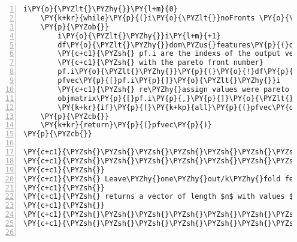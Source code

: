 \begin{Verbatim}[commandchars=\\\{\},codes={\catcode`\$=3\catcode`\^=7\catcode`\_=8},gobble=0,numbers=left,fontfamily=fvm,fontshape=n,fontsize=\footnotesize,tabsize=2]
	i\PY{o}{\PYZlt{}\PYZhy{}}\PY{l+m}{0}
	\PY{k+kr}{while}\PY{p}{(}i\PY{o}{\PYZlt{}}noFronts \PY{o}{\PYZam{}\PYZam{}} \PY{o}{!}allFrontsFound\PY{p}{)} \PY{c+c1}{\PYZsh{}go thru all fronts required}
	\PY{p}{\PYZob{}}
		i\PY{o}{\PYZlt{}\PYZhy{}}i\PY{l+m}{+1}
		df\PY{o}{\PYZlt{}\PYZhy{}}dom\PYZus{}features\PY{p}{(}objmatrix\PY{p}{,}\PY{k+kp}{rep}\PY{p}{(}\PY{k+kc}{FALSE}\PY{p}{,}m\PY{p}{)}\PY{p}{)} \PY{c+c1}{\PYZsh{}general m obj vectors function}
		\PY{c+c1}{\PYZsh{} pf.i are the indexs of the output vector that need to be updated }
		\PY{c+c1}{\PYZsh{} with the pareto front number}
		pf.i\PY{o}{\PYZlt{}\PYZhy{}}\PY{p}{(}\PY{o}{!}df\PY{p}{)} \PY{o}{\PYZam{}} \PY{p}{(}pfvec\PY{o}{\PYZlt{}}\PY{l+m}{1}\PY{p}{)} 
		pfvec\PY{p}{[}pf.i\PY{p}{]}\PY{o}{\PYZlt{}\PYZhy{}}i
		\PY{c+c1}{\PYZsh{} re\PYZhy{}assign values were pareto front found}
		objmatrix\PY{p}{[}pf.i\PY{p}{,}\PY{p}{]}\PY{o}{\PYZlt{}\PYZhy{}}ourInfs
		\PY{k+kr}{if}\PY{p}{(}\PY{k+kp}{all}\PY{p}{(}pfvec\PY{o}{\PYZgt{}}\PY{l+m}{0}\PY{p}{)}\PY{p}{)} allFrontsFound\PY{o}{\PYZlt{}\PYZhy{}}\PY{k+kc}{TRUE}
	\PY{p}{\PYZcb{}}
	\PY{k+kr}{return}\PY{p}{(}pfvec\PY{p}{)}
\PY{p}{\PYZcb{}}

\PY{c+c1}{\PYZsh{}\PYZsh{}\PYZsh{}\PYZsh{}\PYZsh{}\PYZsh{}\PYZsh{}\PYZsh{}\PYZsh{}\PYZsh{}\PYZsh{}\PYZsh{}\PYZsh{}\PYZsh{}\PYZsh{}\PYZsh{}\PYZsh{}\PYZsh{}\PYZsh{}\PYZsh{}\PYZsh{}\PYZsh{}\PYZsh{}\PYZsh{}\PYZsh{}\PYZsh{}\PYZsh{}\PYZsh{}\PYZsh{}\PYZsh{}\PYZsh{}\PYZsh{}\PYZsh{}\PYZsh{}\PYZsh{}\PYZsh{}\PYZsh{}\PYZsh{}\PYZsh{}\PYZsh{}\PYZsh{}\PYZsh{}}
\PY{c+c1}{\PYZsh{}\PYZsh{}\PYZsh{}\PYZsh{}\PYZsh{}\PYZsh{}\PYZsh{}\PYZsh{}\PYZsh{}\PYZsh{}\PYZsh{}\PYZsh{}\PYZsh{}\PYZsh{}\PYZsh{}\PYZsh{}\PYZsh{}\PYZsh{}\PYZsh{}\PYZsh{}\PYZsh{}\PYZsh{}\PYZsh{}\PYZsh{}\PYZsh{}\PYZsh{}\PYZsh{}\PYZsh{}\PYZsh{}\PYZsh{}\PYZsh{}\PYZsh{}\PYZsh{}\PYZsh{}\PYZsh{}\PYZsh{}\PYZsh{}\PYZsh{}\PYZsh{}\PYZsh{}\PYZsh{}\PYZsh{}}
\PY{c+c1}{\PYZsh{}}
\PY{c+c1}{\PYZsh{} Leave\PYZhy{}one\PYZhy{}out/k\PYZhy{}fold feature ranking}
\PY{c+c1}{\PYZsh{}}
\PY{c+c1}{\PYZsh{} returns a vector of length $n$ with values $\in (0,1]$ for feature importance		}
\PY{c+c1}{\PYZsh{}}
\PY{c+c1}{\PYZsh{}\PYZsh{}\PYZsh{}\PYZsh{}\PYZsh{}\PYZsh{}\PYZsh{}\PYZsh{}\PYZsh{}\PYZsh{}\PYZsh{}\PYZsh{}\PYZsh{}\PYZsh{}\PYZsh{}\PYZsh{}\PYZsh{}\PYZsh{}\PYZsh{}\PYZsh{}\PYZsh{}\PYZsh{}\PYZsh{}\PYZsh{}\PYZsh{}\PYZsh{}\PYZsh{}\PYZsh{}\PYZsh{}\PYZsh{}\PYZsh{}\PYZsh{}\PYZsh{}\PYZsh{}\PYZsh{}\PYZsh{}\PYZsh{}\PYZsh{}\PYZsh{}\PYZsh{}\PYZsh{}\PYZsh{}}
\PY{c+c1}{\PYZsh{}\PYZsh{}\PYZsh{}\PYZsh{}\PYZsh{}\PYZsh{}\PYZsh{}\PYZsh{}\PYZsh{}\PYZsh{}\PYZsh{}\PYZsh{}\PYZsh{}\PYZsh{}\PYZsh{}\PYZsh{}\PYZsh{}\PYZsh{}\PYZsh{}\PYZsh{}\PYZsh{}\PYZsh{}\PYZsh{}\PYZsh{}\PYZsh{}\PYZsh{}\PYZsh{}\PYZsh{}\PYZsh{}\PYZsh{}\PYZsh{}\PYZsh{}\PYZsh{}\PYZsh{}\PYZsh{}\PYZsh{}\PYZsh{}\PYZsh{}\PYZsh{}\PYZsh{}\PYZsh{}\PYZsh{}}


\end{Verbatim}
